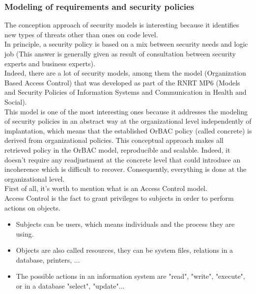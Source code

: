 \documentclass{acm_proc_article-sp}
\begin{document}
\subsubsection{Modeling of requirements and security policies}
The conception approach of security models is interesting because it identifies new types of threats other than ones on code level.\\
In principle, a security policy is based on a mix between security needs and logic job (This answer is generally given as result of consultation between security experts and business experts).\\
Indeed, there are a lot of security models, among them the model (Organization Based Access Control)\cite{Anas,DBLP:conf/acsac/CuppensM03} that was developed as part of the RNRT MP6 (Models and Security Policies of Information Systems and Communication in Health and Social).\\
This model is one of the most interesting ones because it addresses the modeling of security policies in an abstract way at the organizational level independently of implantation, which means that the established OrBAC policy (called concrete) is derived from organizational policies. This conceptual approach makes all retrieved policy in the OrBAC model, reproducible and scalable. Indeed, it doesn't require any readjustment at the concrete level that could introduce an incoherence which is difficult to recover. Consequently, everything is done at the organizational level.\\
First of all, it's worth to mention what is an Access Control model.\\
Access Control is the fact to grant privileges to subjects in order to perform actions on objects.
\begin{itemize}
 \item Subjects can be users, which means individuals and the process they are using.
 \item Objects are also called resources, they can be system files, relations in a database, printers, ...
 \item The possible actions in an information system are "read", "write", "execute", or in a database "select", "update"...
\end{itemize}
\end{document}

